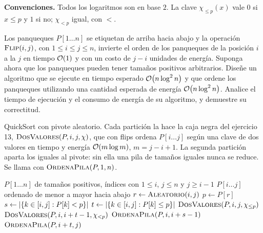 \documentclass[11pt,letterpaper]{article}
\begin{document}

\noindent\textbf{Convenciones.}
Todos los logaritmos son en base $2$. La clave $\chi_{\le p}(x)$ vale
$0$ si $x \le p$ y $1$ si no; $\chi_{<p}$ igual, con $<$.

\noindent Los panqueques $P[1 \ldots n]$ se etiquetan de arriba hacia
abajo y la operación $\textsc{Flip}(i, j)$, con $1 \le i \le j \le n$,
invierte el orden de los panqueques de la posición $i$ a la $j$ en
tiempo $\mathcal{O}\!\left(1\right)$ y con un costo de $j - i$ unidades de energía.
Suponga ahora que los panqueques pueden tener tamaños positivos
arbitrarios. Diseñe un algoritmo que se ejecute en tiempo esperado
$\mathcal{O}\!\left(n \log^{2} n\right)$ y que ordene los panqueques utilizando una
cantidad esperada de energía $\mathcal{O}\!\left(n \log^{2} n\right)$. Analice el tiempo
de ejecución y el consumo de energía de su algoritmo, y demuestre su
correctitud.

 QuickSort con pivote aleatorio. Cada partición la
hace la caja negra del ejercicio 13, $\textsc{DosValores}(P, i, j,
\chi)$, que con flips ordena $P[i \ldots j]$ según una clave de dos
valores en tiempo y energía $\mathcal{O}\!\left(m \log m\right)$, $m = j - i + 1$. La
segunda partición aparta los iguales al pivote: sin ella una pila de
tamaños iguales nunca se reduce. Se llama con
$\textsc{OrdenaPila}(P, 1, n)$.

\begin{algorithm}[H]
  \caption{Ordena una pila de panqueques de tamaños arbitrarios}
  \label{ej14:ej14-alg-ordena-pila}
  \begin{algorithmic}[1]
    \Require $P[1 \ldots n]$ de tamaños positivos, índices con
             $1 \le i$, $j \le n$ y $j \ge i - 1$
    \Ensure $P[i \ldots j]$ ordenado de menor a mayor hacia abajo
        \State \Return
      \EndIf
      \State $r \gets \Call{Aleatorio}{i, j}$
      \State $p \gets P[r]$
      \State $s \gets \left\lvert \left\{ k \in [i, j] : P[k] < p \right\} \right\rvert$
      \State $t \gets \left\lvert \left\{ k \in [i, j] : P[k] \le p \right\} \right\rvert$
      \State $\Call{DosValores}{P, i, j, \chi_{\le p}}$
      \State $\Call{DosValores}{P, i, i + t - 1, \chi_{<p}}$
      \State $\Call{OrdenaPila}{P, i, i + s - 1}$
      \State $\Call{OrdenaPila}{P, i + t, j}$
    \EndProcedure
  \end{algorithmic}
\end{algorithm}
\end{document}
